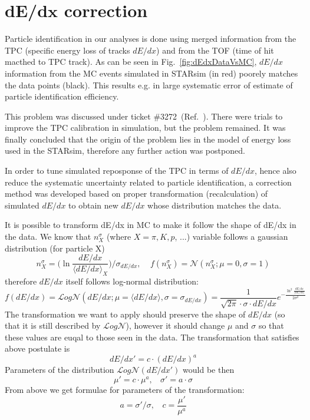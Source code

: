 

\chapter{\texorpdfstring{d$\bm{E}$/d$\bm{x}$}{dE/dx} correction}\label{chap:dEdxCorrection}

Particle identification in our analyses is done using merged information from the TPC (specific energy loss of tracks $dE/dx$) and from the TOF (time of hit macthed to TPC track). As can be seen in Fig.~\ref{fig:dEdxDataVsMC}, $dE/dx$ information from the MC events simulated in STARsim (in red) poorely matches the data points (black). This results e.g. in large systematic error of estimate of particle identification efficiency.

This problem was discussed under ticket \#3272~(Ref.~\cite{dedxTicket}). There were trials to improve the TPC calibration in simulation, but the problem remained. It was finally concluded that the origin of the problem lies in the model of energy loss used in the STARsim, therefore any further action was postponed. 

In order to tune simulated reposponse of the TPC in terms of $dE/dx$, hence also reduce the systematic uncertainty related to particle identification, a correction method was developed based on proper transformation (recalculation) of simulated $dE/dx$ to obtain new $dE/dx$ whose distribution matches the data.

It is possible to transform dE/dx in MC to make it follow the shape of dE/dx in the data. 
We know that $n^{\sigma}_{X}$ (where $X=\pi, K, p$, ...) variable follows a gaussian distribution (for particle X)
 \[n^{\sigma}_{X} = \Big( \ln{\frac{dE/dx}{\langle dE/dx\rangle_{X}}} \Big) / \sigma_{dE/dx},~~~~~f(n^{\sigma}_{X}) = \mathcal{N}(n^{\sigma}_{X}; \mu=0,\sigma=1)\]
therefore $dE/dx$ itself follows log-normal distribution:
\[f(dE/dx) = \mathcal{L}og\mathcal{N}(dE/dx; \mu=\langle dE/dx\rangle,\sigma=\sigma_{dE/dx}) = \frac{1}{\sqrt{2\pi}\cdot \sigma\cdot dE/dx}e^{-\frac{\ln^{2}{\frac{dE/dx}{\langle dE/dx\rangle}}}{2\sigma^{2}}}\]
The transformation we want to apply should preserve the shape of $dE/dx$ (so that it is still described by $\mathcal{L}og\mathcal{N}$), however it should change $\mu$ and $\sigma$ so that these values are euqal to those seen in the data. The transformation that satisfies above postulate is
\[dE/dx' = c\cdot (dE/dx)^{a}\]
Parameters of the distribution $\mathcal{L}og\mathcal{N}(dE/dx')$ would be then
\[\mu' = c\cdot\mu^{a},~~~~\sigma' = a\cdot\sigma\]
From above we get formulae for parameters of the transformation:
\[a=\sigma'/\sigma,~~~~c = \frac{\mu'}{\mu^{a}}\]

